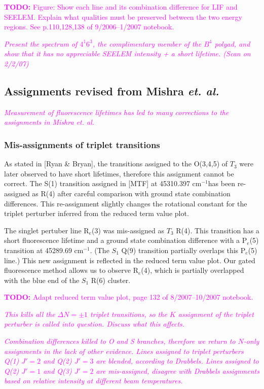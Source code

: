 \documentclass[12pt]{mitthesis}
\newcommand{\TODO} [1]{\textcolor{magenta}{\textbf{TODO:} #1}}
\newcommand{\POINT}[1]{\textcolor{magenta}{\emph{#1}}}
\newcommand{\rcm}{cm$^{-1}$}
\begin{document}
\TODO{Figure: Show each line and its combination difference for LIF
  and SEELEM.  Explain what qualities must be preserved between the
  two energy regions.  See p.110,128,138 of 9/2006--1/2007 notebook.}

\POINT{Present the spectrum of $4^1 6^3$, the complimentary member of
  the $B^4$ polyad, and show that it has no appreciable SEELEM
  intensity + a short lifetime. (Scan on 2/2/07)}

\subsection{Assignments revised from Mishra \emph{et. al.}}

\POINT{Measurement of fluorescence lifetimes has led to many
  corrections to the assignments in Mishra \emph{et. al.}}

\subsubsection{Mis-assignments of triplet transitions}

As stated in [Ryan \& Bryan], the transitions assigned to the O(3,4,5)
of $T_3$ were later observed to have short lifetimes, therefore this
assignment cannot be correct.  The S(1) transition assigned in [MTF]
at 45310.397 \rcm has been re-assigned as R(4) after careful
comparison with ground state combination differences.  This
re-assignment slightly changes the rotational constant for the triplet
perturber inferred from the reduced term value plot.

The singlet pertuber line R$_e$(3) was mis-assigned as $T_3$ R(4).
This transition has a short fluorescence lifetime and a ground state
combination difference with a P$_e$(5) transition at 45289.69 \rcm.
(The $S_1$ Q(9) transition partially overlaps this P$_e$(5) line.)
This new assignment is reflected in the reduced term value plot.  Our
gated fluorescence method allows us to observe R$_e$(4), which is
partially overlapped with the blue end of the $S_1$ R(6) cluster.

\TODO{Adapt reduced term value plot, page 132 of 8/2007--10/2007
  notebook.}

\POINT{This kills all the $\Delta N=\pm 1$ triplet transitions, so the
  $K$ assignment of the triplet perturber is called into question.
  Discuss what this affects.}

\POINT{Combination differences killed to O and S branches, therefore
  we return to $N$-only assignments in the lack of other evidence.
  Lines assigned to triplet perturbers Q(1) $J'=2$ and Q(2) $J'=3$ are
  blended, according to Drabbels.  Lines assigned to Q(2) $J'=1$ and
  Q(3) $J'=2$ are mis-assigned, disagree with Drabbels assignments
  based on relative intensity at different beam temperatures.}
\end{document}

